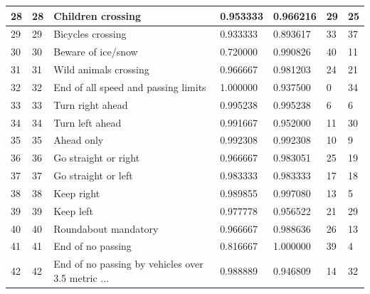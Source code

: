 \documentclass[]{article}
\begin{document}
\begin{table}[]
{\begin{tabular}{lllllll}
			28        & 28          & Children crossing                                 & 0.953333 & 0.966216        & 29           & 25 \\ \hline
			29        & 29          & Bicycles crossing                                 & 0.933333 & 0.893617        & 33           & 37 \\ \hline
			30        & 30          & Beware of ice/snow                                & 0.720000 & 0.990826        & 40           & 11 \\ \hline
			31        & 31          & Wild animals crossing                             & 0.966667 & 0.981203        & 24           & 21 \\ \hline
			32        & 32          & End of all speed and passing limits               & 1.000000 & 0.937500        & 0            & 34 \\ \hline
			33        & 33          & Turn right ahead                                  & 0.995238 & 0.995238        & 6            & 6  \\ \hline
			34        & 34          & Turn left ahead                                   & 0.991667 & 0.952000        & 11           & 30 \\ \hline
			35        & 35          & Ahead only                                        & 0.992308 & 0.992308        & 10           & 9  \\ \hline
			36        & 36          & Go straight or right                              & 0.966667 & 0.983051        & 25           & 19 \\ \hline
			37        & 37          & Go straight or left                               & 0.983333 & 0.983333        & 17           & 18 \\ \hline
			38        & 38          & Keep right                                        & 0.989855 & 0.997080        & 13           & 5  \\ \hline
			39        & 39          & Keep left                                         & 0.977778 & 0.956522        & 21           & 29 \\ \hline
			40        & 40          & Roundabout mandatory                              & 0.966667 & 0.988636        & 26           & 13 \\ \hline
			41        & 41          & End of no passing                                 & 0.816667 & 1.000000        & 39           & 4  \\ \hline
			42        & 42          & End of no passing by vehicles over 3.5 metric ... & 0.988889 & 0.946809        & 14           & 32 \\ \hline
		\end{tabular}%
	}
\end{table}
\end{document}
